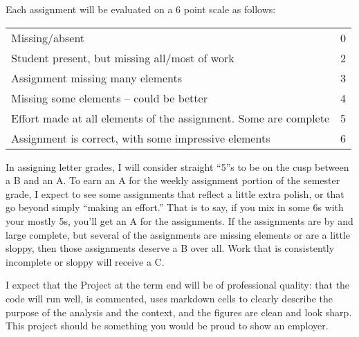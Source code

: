 \documentclass[11pt, a4paper]{article}
\begin{document}
Each assignment will be evaluated on a 6 point scale as follows:  
\begin{center}

\begin{tabular}{l l}
Missing/absent & 0 \\
Student present, but missing all/most of work & 2 \\
Assignment missing many elements & 3 \\
Missing some elements -- could be better & 4 \\
Effort made at all elements of the assignment. Some are complete & 5 \\
Assignment is correct, with some impressive elements & 6 \\
\end{tabular}

\end{center}

In assigning letter grades, I will consider straight ``5''s to be on the cusp between a B and an A.  To earn an A for the weekly assignment portion of the semester grade, I expect to see some assignments that reflect a little extra polish, or that go beyond simply ``making an effort.''  That is to say, if you mix in some 6s with your mostly 5s, you'll get an A for the assignments.  If the assignments are by and large complete, but several of the assignments are missing elements or are a little sloppy, then those assignments deserve a B over all.  Work that is consistently incomplete or sloppy will receive a C.  

I expect that the Project at the term end will be of professional quality: that the code will run well, is commented, uses markdown cells to clearly describe the purpose of the analysis and the context, and the figures are clean and look sharp.  This project should be something you would be proud to show an employer.

\end{document}
